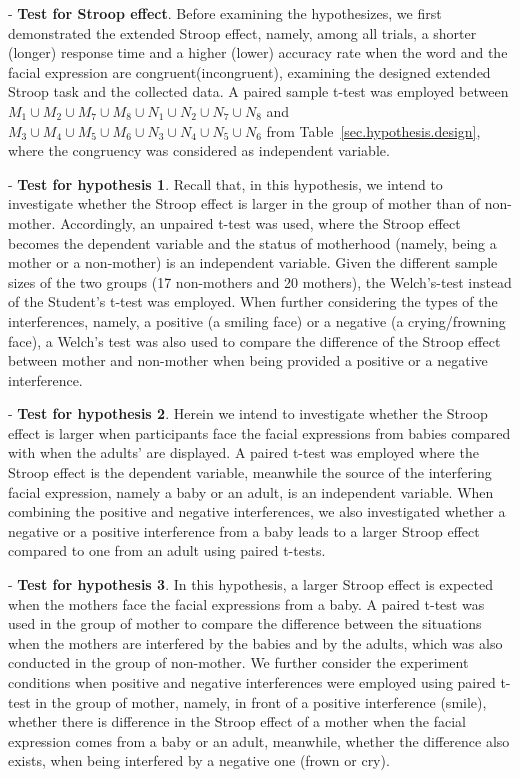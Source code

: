 \noindent - \textbf{Test for Stroop effect}.
Before examining the hypothesizes,
we first demonstrated the extended Stroop effect, namely,
among all trials,
a shorter (longer) response time and a higher (lower) accuracy rate
when the word and the facial expression are congruent(incongruent),
examining the designed extended Stroop task and the collected data.
A paired sample t-test was employed between 
$M_1\cup M_2\cup M_7\cup M_8\cup N_1\cup N_2\cup N_7\cup N_8$ and
$M_3\cup M_4\cup M_5\cup M_6\cup N_3\cup N_4\cup N_5\cup N_6$ from Table~\ref{sec.hypothesis.design},
where the congruency was considered as independent variable. 

\noindent - \textbf{Test for hypothesis 1}.
Recall that, in this hypothesis, we intend to investigate whether the Stroop effect is larger in the group of mother than of non-mother. Accordingly, an unpaired t-test was used, 
where the Stroop effect becomes the dependent variable and 
the status of motherhood (namely, being a mother or a non-mother) is an independent variable. 
Given the different sample sizes of the two groups (17 non-mothers and 20 mothers), 
the Welch's-test instead of the Student's t-test was employed. 
When further considering the types of the interferences, namely,
a positive (a smiling face) or a negative (a crying/frowning face), a Welch's test was also used to compare the difference of the Stroop effect between mother and non-mother when being provided a positive or a negative interference.

\noindent - \textbf{Test for hypothesis 2}.
Herein we intend to investigate whether the Stroop effect is larger when participants face the facial expressions from babies compared with when the adults' are displayed. A paired t-test was employed 
where the Stroop effect is the dependent variable, meanwhile the source of the interfering facial expression, namely a baby or an adult, is an independent variable. When combining the positive and negative interferences, we also investigated whether a negative or a positive interference from a baby leads to a larger Stroop effect compared to one from an adult using paired t-tests.


\noindent - \textbf{Test for hypothesis 3}.
In this hypothesis, a larger Stroop effect is expected 
when the mothers face the facial expressions from a baby. A paired t-test was used in the group of mother to compare the difference between the situations when the mothers are interfered by the babies and
by the adults, which was also conducted in the group of non-mother. We further consider the experiment conditions
when positive and negative interferences
were employed using paired t-test in the group of mother, namely, in front of a positive interference (smile), whether there is difference in the Stroop effect of a mother when the facial expression comes from a baby or an adult, meanwhile, whether the difference also exists, when being interfered by a negative one (frown or cry).

